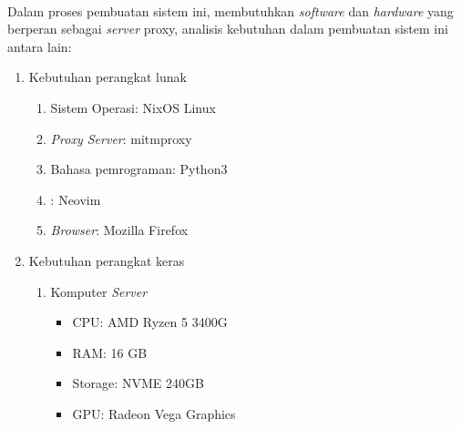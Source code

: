\documentclass[./bab_3.tex]{subfiles}
\begin{document}
  \paragraph*{}Dalam proses pembuatan sistem ini, membutuhkan
  \textit{software} dan \textit{hardware} yang berperan
  sebagai \textit{server} proxy, analisis kebutuhan dalam
  pembuatan sistem ini antara lain:
  \begin{enumerate}
    \item Kebutuhan perangkat lunak
    \begin{enumerate}
      \item Sistem Operasi: NixOS Linux
      \item \textit{Proxy Server}: mitmproxy
      \item Bahasa pemrograman: Python3
      \item {}: Neovim
      \item \textit{Browser}: Mozilla Firefox
    \end{enumerate}
    \item Kebutuhan perangkat keras
    \begin{enumerate}
      \item Komputer \textit{Server}
      \begin{itemize}
        \item CPU: AMD Ryzen 5 3400G
        \item RAM: 16 GB
        \item Storage: NVME 240GB
        \item GPU: Radeon Vega Graphics
      \end{itemize}
    \end{enumerate}
  \end{enumerate}
\end{document}
